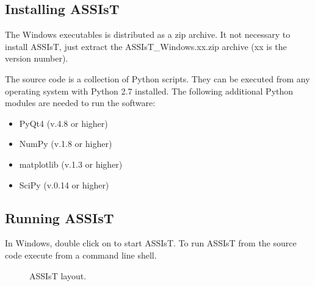 \documentclass[a4paper,11pt,english]{article}
\begin{document}
\subsection{Installing ASSIsT}
\label{index:installing-assist}
The Windows executables is distributed as a zip archive. It not necessary to install ASSIsT, just
extract the ASSIsT\_Windows.xx.zip archive (xx is the version number).

The source code is a collection of Python scripts. They can be executed from any operating system
with
Python 2.7 installed. The following additional Python modules are needed to run the software:
\begin{itemize}
\item PyQt4 (v.4.8 or higher)
\item NumPy (v.1.8 or higher)
\item matplotlib (v.1.3 or higher)
\item SciPy (v.0.14 or higher)
\end{itemize}


\subsection{Running ASSIsT}
\label{index:running-assist}
In Windows, double click on {} to start ASSIsT.
To run ASSIsT from the source code execute {} from a command line shell.
\begin{figure}[H]
\centering
\capstart

\caption{ASSIsT layout.}\end{figure}
\end{document}
